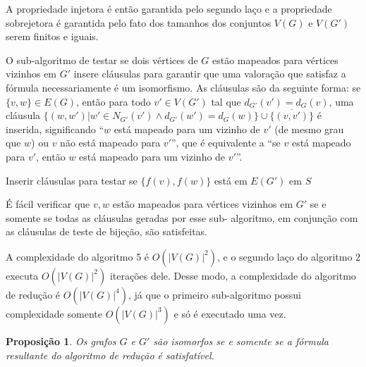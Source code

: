 \documentclass[12pt,a4paper]{article}
\newtheorem{proposicao}{Proposição}
\begin{document}
A propriedade injetora é então garantida pelo segundo laço e a propriedade sobrejetora é garantida pelo fato dos tamanhos dos conjuntos 
$V(G)$ e $V(G')$ serem finitos e iguais. 

O sub-algoritmo de testar se dois vértices de $G$ estão mapeados para vértices vizinhos em $G'$ insere cláusulas para garantir que uma 
valoração que satisfaz a fórmula necessariamente é um isomorfismo. As cláusulas são da seguinte forma: se $\{v,w\} \in E(G)$, então 
para todo $v' \in V(G')$ tal que $d_{G'}(v')=d_G(v)$, uma cláusula 
$\{(w,w') | w' \in N_{G'}(v') \wedge d_{G'}(w')=d_G(w)\}\cup\{\overline{(v,v')}\}$
é inserida, significando ``$w$ está mapeado para um vizinho de $v'$ (de mesmo grau que $w$) ou $v$ não está 
mapeado para $v'$'', que é equivalente a ``se $v$ está mapeado para $v'$, então $w$ está mapeado para um vizinho de $v'$''.

\begin{algorithm}[H]

\caption{Inserir cláusulas para testar se $\{f(v),f(w)\}$ está em $E(G')$ em $S$}
\end{algorithm}

É fácil verificar que $v,w$ estão mapeados para vértices vizinhos em $G'$ se e somente se todas as cláusulas geradas por esse sub-
algoritmo, em conjunção com as cláusulas de teste de bijeção, são satisfeitas.

A complexidade do algoritmo 5 é $O(|V(G)|^2)$, e o segundo laço do algoritmo 2 executa $O(|V(G)|^2)$ iterações dele. 
Desse modo, a complexidade do algoritmo de redução é $O(|V(G)|^4)$, já que o primeiro sub-algoritmo possui complexidade somente 
$O(|V(G)|^3)$ e só é executado uma vez.

\begin{proposicao}
Os grafos $G$ e $G'$ são isomorfos se e somente se a fórmula resultante do algoritmo de redução é satisfatível.
\end{proposicao}
\end{document}
